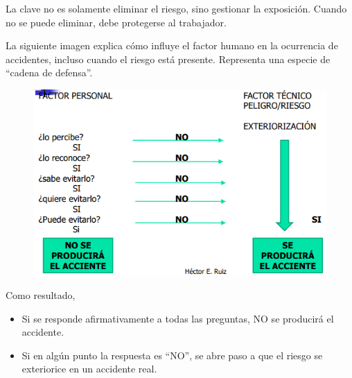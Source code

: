 \documentclass[a4paper,oneside,11pt]{article}
\begin{document}
La clave no es solamente eliminar el riesgo, sino gestionar la exposición. Cuando no se puede eliminar, debe protegerse al trabajador.

La siguiente imagen explica cómo influye el factor humano en la ocurrencia de accidentes, incluso cuando el riesgo está presente. Representa una especie de “cadena de defensa”.


\begin{figure} [ht!]
    \centering
    \includegraphics[width=0.6\linewidth]{factor personal.png}
\end{figure}

\begin{table}[ht!]
\end{table}


Como resultado, 
\begin{itemize}
    \item Si se responde afirmativamente a todas las preguntas, NO se producirá el accidente.
    \item Si en algún punto la respuesta es “NO”, se abre paso a que el riesgo se exteriorice en un accidente real.
\end{itemize}
\end{document}
